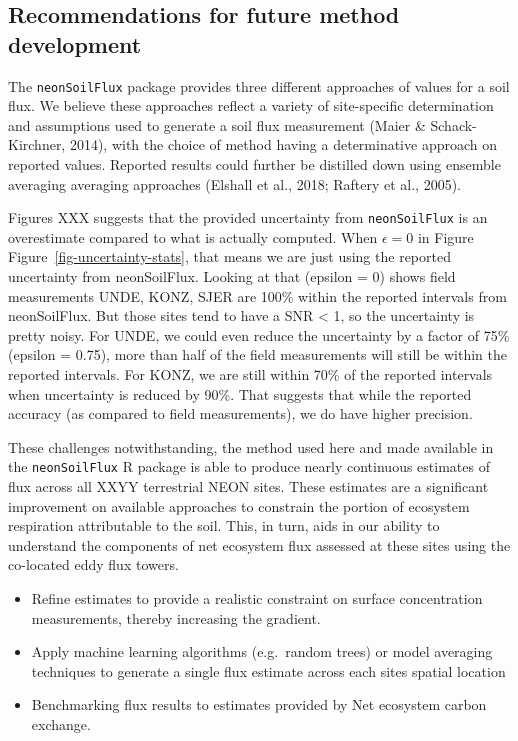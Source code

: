 \documentclass[
  letterpaper,
  DIV=11,
  numbers=noendperiod]{scrartcl}
\providecommand{\tightlist}{%
  \setlength{\itemsep}{0pt}\setlength{\parskip}{0pt}}\usepackage{longtable,booktabs,array}
\begin{document}
\subsection{Recommendations for future method
development}\label{recommendations-for-future-method-development}

The \texttt{neonSoilFlux} package provides three different approaches of
values for a soil flux. We believe these approaches reflect a variety of
site-specific determination and assumptions used to generate a soil flux
measurement (Maier \& Schack-Kirchner, 2014), with the choice of method
having a determinative approach on reported values. Reported results
could further be distilled down using ensemble averaging averaging
approaches (Elshall et al., 2018; Raftery et al., 2005).

Figures XXX suggests that the provided uncertainty from
\texttt{neonSoilFlux} is an overestimate compared to what is actually
computed. When \(\epsilon=0\) in Figure
Figure~\ref{fig-uncertainty-stats}, that means we are just using the
reported uncertainty from neonSoilFlux. Looking at that (epsilon = 0)
shows field measurements UNDE, KONZ, SJER are 100\% within the reported
intervals from neonSoilFlux. But those sites tend to have a SNR
\textless{} 1, so the uncertainty is pretty noisy. For UNDE, we could
even reduce the uncertainty by a factor of 75\% (epsilon = 0.75), more
than half of the field measurements will still be within the reported
intervals. For KONZ, we are still within 70\% of the reported intervals
when uncertainty is reduced by 90\%. That suggests that while the
reported accuracy (as compared to field measurements), we do have higher
precision.

These challenges notwithstanding, the method used here and made
available in the \texttt{neonSoilFlux} R package is able to produce
nearly continuous estimates of flux across all XXYY terrestrial NEON
sites. These estimates are a significant improvement on available
approaches to constrain the portion of ecosystem respiration
attributable to the soil. This, in turn, aids in our ability to
understand the components of net ecosystem flux assessed at these sites
using the co-located eddy flux towers.

\begin{itemize}
\tightlist
\item
  Refine estimates to provide a realistic constraint on surface
  concentration measurements, thereby increasing the gradient.
\item
  Apply machine learning algorithms (e.g.~random trees) or model
  averaging techniques to generate a single flux estimate across each
  sites spatial location
\item
  Benchmarking flux results to estimates provided by Net ecosystem
  carbon exchange.
\end{itemize}
\end{document}
